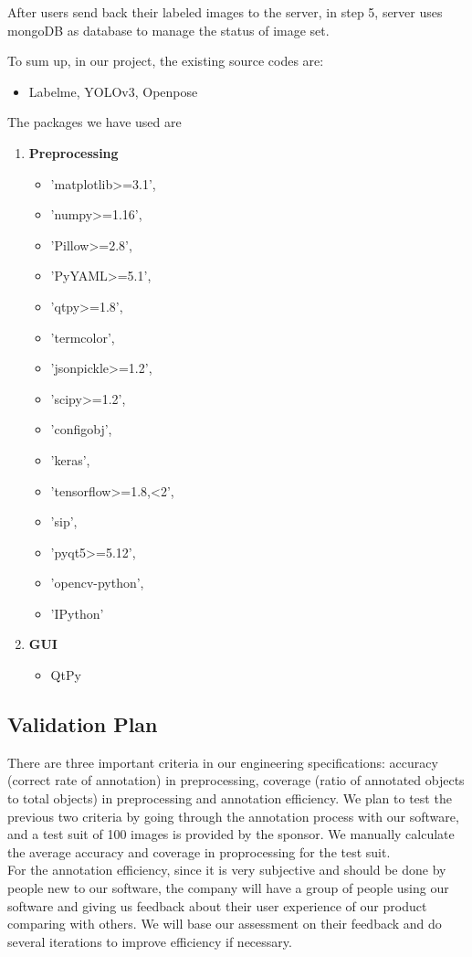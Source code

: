 After users send back their labeled images to the server, in step 5, server
uses mongoDB as database to manage the status of image set.

To sum up, in our project, the existing source codes are:
\begin{itemize}
    \item Labelme\cite{labelme}, YOLOv3\cite{Redmon2018YOLOv3},
Openpose\cite{Cao2016Realtime}
\end{itemize}
The packages we have used are
\begin{enumerate}
    \item \textbf{Preprocessing}
    \begin{itemize}
        \item     'matplotlib>=3.1',
         \item 'numpy>=1.16',
        \item  'Pillow>=2.8',
        \item  'PyYAML>=5.1',
    \item 'qtpy>=1.8',
    \item 'termcolor',
    \item 'jsonpickle>=1.2',
    \item 'scipy>=1.2',
     \item 'configobj',
     \item 'keras',
     \item 'tensorflow>=1.8,<2',
     \item 'sip',
     \item 'pyqt5>=5.12',
     \item 'opencv-python',
     \item 'IPython'
       \end{itemize}
    \item \textbf{GUI}
    \begin{itemize}
        \item QtPy
    \end{itemize}
\end{enumerate}



\subsection{Validation Plan}
There are three important criteria in our engineering specifications: accuracy
(correct rate of annotation) in preprocessing, coverage (ratio of annotated
objects to total objects) in preprocessing and annotation efficiency.
We plan to test the previous two criteria by going through the annotation
process with our software, and a test suit of 100 images is provided by the
sponsor. We manually calculate the average accuracy and coverage in
proprocessing for the test suit.\\
For the annotation efficiency, since it is very subjective and should be done
by people new to our software, the company will have a group of people using
our software and giving us feedback about their user experience of our product
comparing with others. We will base our assessment on their feedback and do
several iterations to improve efficiency if necessary.
